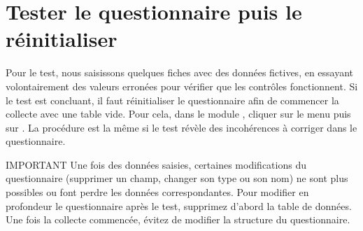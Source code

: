 \section{Tester le questionnaire puis le réinitialiser}

Pour le test, nous saisissons quelques fiches avec des données fictives, en essayant volontairement des valeurs erronées pour vérifier que les contrôles fonctionnent. Si le test est concluant, il faut réinitialiser le questionnaire afin de commencer la collecte avec une table vide. Pour cela, dans le module , cliquer sur le menu  puis sur . La procédure est la même si le test révèle des incohérences à corriger dans le questionnaire.

\begin{mybox}[colbacktitle=IMPORTANT]{\faExclamationCircle{} IMPORTANT}
Une fois des données saisies, certaines modifications du questionnaire (supprimer un champ, changer son type ou son nom) ne sont plus possibles ou font perdre les données correspondantes. Pour modifier en profondeur le questionnaire après le test, supprimez d'abord la table de données. Une fois la collecte commencée, évitez de modifier la structure du questionnaire.
\end{mybox}
